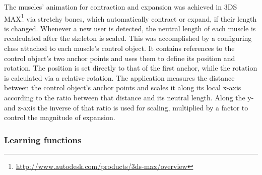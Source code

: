 The muscles' animation for contraction and expansion was achieved in 3DS MAX\footnote{\url{http://www.autodesk.com/products/3ds-max/overview}} via stretchy bones, which automatically contract or expand, if their length is changed. 
Whenever a new user is detected, the neutral length of each muscle is recalculated after the skeleton is scaled.
This was accomplished by a configuring class attached to each muscle's control object. It contains references to the control object's two anchor points and uses them to define its position and rotation. The position is set directly to that of the first anchor, while the rotation is calculated via a relative rotation.
The application measures the distance between the control object's anchor points and scales it along its local x-axis according to the ratio between that distance and its neutral length. Along the y- and z-axis the inverse of that ratio is used for scaling, multiplied by a factor to control the magnitude of expansion. 

\subsubsection{Learning functions}
